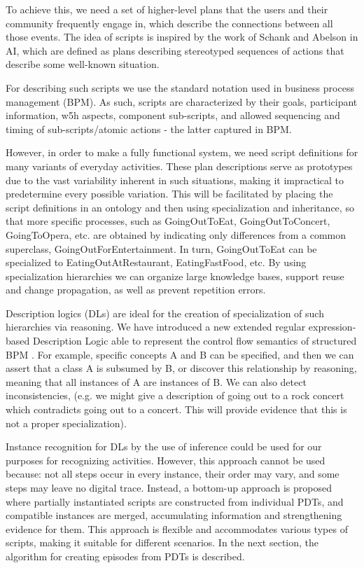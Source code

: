 \documentclass[11pt]{article}
\begin{document}
To achieve this, we need a set of higher-level plans that the users and their community frequently engage in, which describe the connections between all those events. The idea of scripts is inspired by the work of Schank and Abelson in AI\cite{schank1977}, which are defined as plans describing stereotyped sequences of actions that describe some well-known situation.

For describing such scripts we use the standard notation used in business process management (BPM)\cite{declarativeBPM15}. As such, scripts are characterized by their goals, participant information, w5h aspects, component sub-scripts, and allowed sequencing and timing of sub-scripts/atomic actions - the latter captured in BPM. 

However, in order to make a fully functional system, we need script definitions for many variants of everyday activities. These plan descriptions serve as prototypes due to the vast variability inherent in such situations, making it impractical to predetermine every possible variation. This will be facilitated by placing the script definitions in an ontology and then using specialization and inheritance, so that more specific processes, such as GoingOutToEat, GoingOutToConcert, GoingToOpera, etc. are obtained by indicating only differences from a common superclass, GoingOutForEntertainment. In turn, GoingOutToEat can be specialized to EatingOutAtRestaurant, EatingFastFood, etc. By using specialization hierarchies we can organize large knowledge bases, support reuse and change propagation, as well as prevent repetition errors.

Description logics (DLs) are ideal for the creation of specialization of such hierarchies via reasoning.  We have introduced a new extended regular expression-based Description Logic \cite{borgidaai4bpm} able to represent the control flow semantics of structured BPM .%
For example, specific concepts A and B can be specified, and then we can assert that a class A is subsumed by B, or discover this relationship by reasoning, meaning that all instances of A are instances of B. We can also detect inconsistencies, (e.g. we might give a description of going out to a rock concert which contradicts going out to a concert. This will provide evidence that this is not a proper specialization).

Instance recognition for DLs by the use of inference could be used for our purposes for recognizing activities. However, this approach cannot be used because: not all steps occur in every instance, their order may vary, and some steps may leave no digital trace. Instead, a bottom-up approach is proposed where partially instantiated scripts are constructed from individual PDTs, and compatible instances are merged, accumulating information and strengthening evidence for them. This approach is flexible and accommodates various types of scripts, making it suitable for different scenarios. In the next section, the algorithm for creating episodes from PDTs is described.
\end{document}
